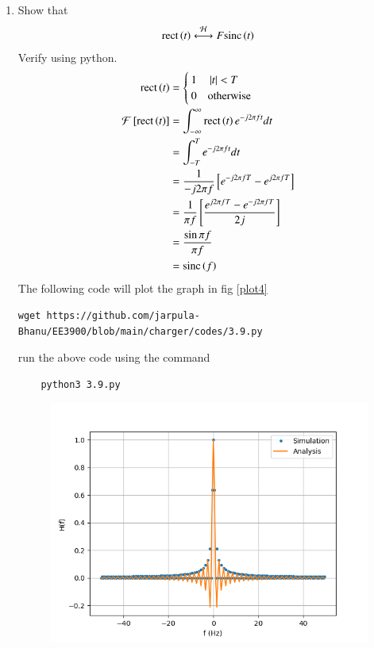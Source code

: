 \documentclass[journal,12pt,twocolumn]{IEEEtran}
\renewcommand\thesection{\arabic{section}}
\begin{document}
\begin{enumerate}[label=\thesection.\arabic*
	,ref=\thesection.\theenumi]
	 \item Show that 
	 \begin{align}
		 \text{rect}\left(t\right) \overset{\mathcal{H}}{ \longleftrightarrow}{F} \text{sinc}\left(t\right)
	 \end{align}
	 Verify using python.\\
	 \solution \begin{align}
		\text{rect}\left(t\right) &= \begin{cases}
			1 \quad \left\vert t\right\vert<T\\
			0 \quad \text{otherwise}
		\end{cases}\\
		\mathcal{F}{}\left[\text{rect}\left(t\right)\right]&= \int_{-\infty}^\infty \text{rect}\left(t\right)e^{-j2\pi ft}dt\\
		&= \int_{-T}^T e^{-j2\pi ft}dt\\
		&=\frac{1}{-j2\pi f}{}\left[e^{-j2\pi fT}-e^{j2\pi fT}\right]\\
		&=\frac{1}{\pi f}{}\left[ \frac{e^{j2\pi fT}-e^{-j2\pi fT}}{2j}\right]\\
		&=\frac{\sin{\pi f}}{\pi f}\\
		&= \text{sinc}\left(f\right)
	 \end{align}
	 The following code will plot the graph in fig \eqref{plot4}
	\begin{lstlisting}
wget https://github.com/jarpula-Bhanu/EE3900/blob/main/charger/codes/3.9.py
	\end{lstlisting}
	run the above code using the command
	\begin{lstlisting}
	python3 3.9.py
	\end{lstlisting}
	\begin{figure}[!ht]
		\includegraphics[width=\columnwidth]{./figs/3.9.png}

\end{figure}
\end{enumerate}
\end{document}
